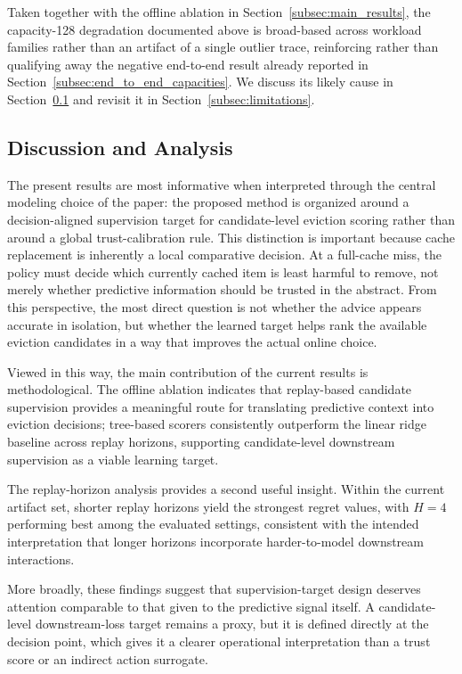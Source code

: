\documentclass[preprint,12pt]{elsarticle}
\begin{document}
Taken together with the offline ablation in Section~\ref{subsec:main_results}, the capacity-128 degradation documented above is broad-based across workload families rather than an artifact of a single outlier trace, reinforcing rather than qualifying away the negative end-to-end result already reported in Section~\ref{subsec:end_to_end_capacities}. We discuss its likely cause in Section~\ref{subsec:discussion_analysis} and revisit it in Section~\ref{subsec:limitations}.

\subsection{Discussion and Analysis}
\label{subsec:discussion_analysis}

The present results are most informative when interpreted through the central modeling choice of the paper: the proposed method is organized around a decision-aligned supervision target for candidate-level eviction scoring rather than around a global trust-calibration rule. This distinction is important because cache replacement is inherently a local comparative decision. At a full-cache miss, the policy must decide which currently cached item is least harmful to remove, not merely whether predictive information should be trusted in the abstract. From this perspective, the most direct question is not whether the advice appears accurate in isolation, but whether the learned target helps rank the available eviction candidates in a way that improves the actual online choice.

Viewed in this way, the main contribution of the current results is methodological. The offline ablation indicates that replay-based candidate supervision provides a meaningful route for translating predictive context into eviction decisions; tree-based scorers consistently outperform the linear ridge baseline across replay horizons, supporting candidate-level downstream supervision as a viable learning target.

The replay-horizon analysis provides a second useful insight. Within the current artifact set, shorter replay horizons yield the strongest regret values, with $H=4$ performing best among the evaluated settings, consistent with the intended interpretation that longer horizons incorporate harder-to-model downstream interactions.

More broadly, these findings suggest that supervision-target design deserves attention comparable to that given to the predictive signal itself. A candidate-level downstream-loss target remains a proxy, but it is defined directly at the decision point, which gives it a clearer operational interpretation than a trust score or an indirect action surrogate.
\end{document}

